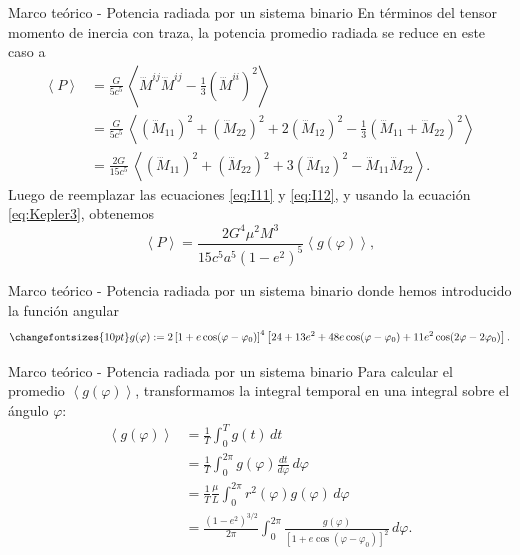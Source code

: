 \begin{frame}{Marco teórico - Potencia radiada por un sistema binario}
    En términos del tensor momento de inercia con traza, la potencia promedio radiada se reduce en este caso a
\begin{align*}
\left\langle P\right\rangle &=\frac{G}{5c^5}\, \left\langle \dddot{M}^{ij}\dddot{M}^{ij}-\frac{1}{3}\left(\dddot{M}^{ii}\right)^2\right\rangle \\
&=\frac{G}{5c^5}\, \left\langle \left(\dddot{M}_{11}\right)^2+ \left(\dddot{M}_{22}\right)^2+2 \left(\dddot{M}_{12}\right)^2-\frac{1}{3}\left(\dddot{M}_{11}+\dddot{M}_{22}\right)^2\right\rangle \\
&=\frac{2G}{15c^5}\, \left\langle \left(\dddot{M}_{11}\right)^2+ \left(\dddot{M}_{22}\right)^2+3\left(\dddot{M}_{12}\right)^2 -\dddot{M}_{11}\dddot{M}_{22}\right\rangle .
\end{align*}
Luego de reemplazar las ecuaciones \ref{eq:I11} y \ref{eq:I12}, y usando la ecuación \ref{eq:Kepler3}, obtenemos
\begin{equation*}
\left\langle P\right\rangle = \frac{2G^4\mu^2M^3}{15c^5a^5\left(1-e^2\right)^{5}}\left\langle g(\varphi)\right\rangle ,
\end{equation*}
\end{frame}
\begin{frame}{Marco teórico - Potencia radiada por un sistema binario}
donde hemos introducido la función angular
\begin{equation}\label{eq:Pphi}
    \changefontsizes{10pt}
g(\varphi):=2\left[1+e\cos(\varphi-\varphi_0)\right]^4
\left[24+13e^2+48e\cos(\varphi-\varphi_0) +11e^2\cos(2\varphi-2\varphi_0)\right].
\end{equation}
\end{frame}
\begin{frame}{Marco teórico - Potencia radiada por un sistema binario}
Para calcular el promedio $\left\langle g(\varphi)\right\rangle$, transformamos la integral temporal en una integral sobre el ángulo $\varphi$:
\begin{align*}
\left\langle g(\varphi)\right\rangle &= \frac{1}{T}\int_0^T g(t)\,dt \\
&= \frac{1}{T}\int_0^{2\pi} g(\varphi)\frac{dt}{d\varphi}\,d\varphi \\
&= \frac{1}{T}\frac{\mu}{L}\int_0^{2\pi} r^2(\varphi)g(\varphi)\,d\varphi \\
&= \frac{(1-e^2)^{3/2}}{2\pi}\int_0^{2\pi} \frac{g(\varphi)}{\left[1+e\cos(\varphi-\varphi_0)\right]^2}\,d\varphi.
\end{align*}
\end{frame}
